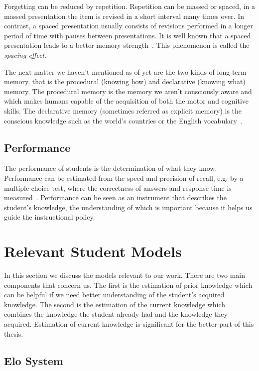 Forgetting can be reduced by repetition. Repetition can be massed or spaced, in a massed presentation the item is revised in a short interval many times over. In contrast, a spaced presentation usually consists of revisions performed in a longer period of time with pauses between presentations. It is well known that a spaced presentation leads to a better memory strength~\cite{RichardE.Mayer2010}. This phenomenon is called the \textit{spacing effect}.

The next matter we haven't mentioned as of yet are the two kinds of long-term memory, that is the procedural (knowing how) and declarative (knowing what) memory. The procedural memory is the memory we aren't consciously aware and which makes humans capable of the acquisition of both the motor and cognitive skills. The declarative memory (sometimes referred as explicit memory) is the conscious knowledge such as the world's countries or the English vocabulary~\cite{MichaelW.Eysenck2008}.

\subsection{Performance}

The performance of students is the determination of what they know. Performance can be estimated from the speed and precision of recall, e.g. by a multiple-choice test, where the correctness of answers and response time is measured~\cite{Lewis}. Performance can be seen as an instrument that describes the student's knowledge, the understanding of which is important because it helps us guide the instructional policy.

\section{Relevant Student Models}
\label{relevant-models}

In this section we discuss the models relevant to our work. There are two main components that concern us. The first is the estimation of prior knowledge which can be helpful if we need better understanding of the student's acquired knowledge. The second is the estimation of the current knowledge which combines the knowledge the student already had and the knowledge they acquired. Estimation of current knowledge is significant for the better part of this thesis.

\subsection{Elo System}
\label{elo}

